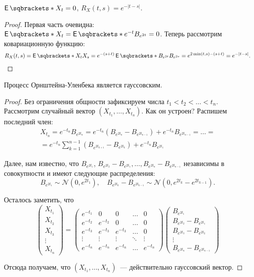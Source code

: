 \begin{property}
	\(\E{X_{t}} = 0\), \(R_{X}(t, s) = e^{-|t - s|}\).
\end{property}
\begin{proof}
	Первая часть очевидна: \(\E{X_{t}} = \E{e^{-t}B_{e^{2t}}} = 0\). Теперь 
	рассмотрим ковариационную функцию:
	\[
		R_{X}(t, s) = \E{X_{t}X_{s}} = e^{-(s + t)}\E{B_{e^{2t}}B_{e^{2s}}} = 
		e^{2\min(t, s) - (s + t)} = e^{-|t - s|}. \qedhere
	\]
\end{proof}
\begin{property}
	Процесс Орнштейна-Уленбека является гауссовским.
\end{property}
\begin{proof}
	Без ограничения общности зафиксируем числа \(t_{1} < t_{2} < \ldots < 
	t_{n}\). Рассмотрим случайный вектор \((X_{t_{1}}, \ldots, X_{t_{n}})\). 
	Как он устроен? Распишем последний член:
	\begin{multline*}
		X_{t_{n}} = e^{-t_{n}}B_{e^{2t_{n}}} = e^{-t_{n}}(B_{e^{2t_{n}}} - 
		B_{e^{2t_{n - 1}}}) + e^{-t_{n}}B_{e^{2t_{n - 1}}} = \ldots = \\ = 
		e^{-t_{n}}\sum_{k = 1}^{n - 1} (B_{e^{2t_{k + 1}}} - 
		B_{e^{2t_{k}}}) + e^{-t_{n}}B_{e^{2t_{1}}}
	\end{multline*}
	
	Далее, нам известно, что \(B_{e^{2t_{1}}}\), \(B_{e^{2t_{2}}} - 
	B_{e^{2t_{1}}}, \ldots, B_{e^{2t_{n}}} - B_{e^{2t_{n - 1}}}\) независимы в 
	совокупности и имеют следующие распределения:
	\[
		B_{e^{2t_{1}}} \sim \mathcal{N}(0, e^{2t_{1}}), \quad B_{e^{2t_{k}}} - 
		B_{e^{2t_{k - 1}}} \sim \mathcal{N}(0, e^{2t_{k}} - e^{2t_{k - 1}}).
	\]
	
	Осталось заметить, что
	\[
	\begin{pmatrix}
	X_{t_{1}} \\ X_{t_{2}} \\ X_{t_{3}} \\ \vdots \\ X_{t_{n}}
	\end{pmatrix}
	=
	\begin{pmatrix}
	e^{-t_{1}} & 0 & 0 & \ldots & 0 \\
	e^{-t_{2}} & e^{-t_{2}} & 0 & \ldots & 0 \\
	e^{-t_{3}} & e^{-t_{3}} & e^{-t_{3}} & \ldots & 0 \\
	\vdots & \vdots & \vdots & \ddots & \vdots \\
	e^{-t_{n}} & e^{-t_{n}} & e^{-t_{n}} & \ldots & e^{-t_{n}}
	\end{pmatrix}
	\begin{pmatrix}
	B_{e^{2t_{1}}} \\ B_{e^{2t_{2}}} - B_{e^{2t_{1}}} \\ B_{e^{2t_{3}}} - 
	B_{e^{2t_{2}}} \\ \vdots \\ B_{e^{2t_{n}}} - B_{e^{2t_{n - 1}}}
	\end{pmatrix}
	\]
	
	Отсюда получаем, что \((X_{t_{1}}, \dots, X_{t_{n}})\)~--- действительно 
	гауссовский вектор.
\end{proof}
